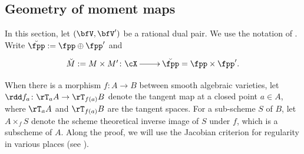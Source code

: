 \documentclass[12pt,a4paper]{amsart}
\numberwithin{equation}{section}
\theoremstyle{remark}
\begin{document}
\subsection{Geometry of moment maps}\label{sec:GM}
In this section, let $(\bfV,\bfV')$ be a rational dual
pair. %
We use the notation of .
Write
 $\dbfpp := \fpp\oplus \fpp'$ and
\[
\xymatrix{
\dbM := M\times M' \colon \cX \ar[r]& \dbfpp
= \fpp\times \fpp'.
}
\]




When there is a morphism $f\colon A\rightarrow B$ between smooth
algebraic varieties, let $\rdd f_a\colon \rT_aA
\rightarrow \rT_{f(a)}B$ denote the tangent map at a closed point $a\in A$, where
$\rT_aA$ and $\rT_{f(a)} B$ are the tangent spaces. For a
sub-scheme $S$ of $B$, let $A\times_fS$ denote the scheme
theoretical inverse image of $S$ under $f$, which is a subscheme of $A$.
Along the proof, we will use the Jacobian criterion for
regularity in various places (see \cite[Theorem~2.19]{LiuAG}).
\end{document}
